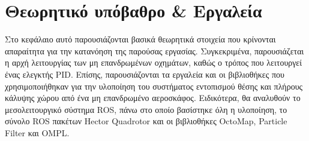 \chapter{Θεωρητικό υπόβαθρο \& Εργαλεία}
\label{chapter:theory_tools}

Στο κεφάλαιο αυτό παρουσιάζονται βασικά θεωρητικά στοιχεία που κρίνονται απαραίτητα για την κατανόηση της παρούσας εργασίας. Συγκεκριμένα, παρουσιάζεται η αρχή λειτουργίας των μη επανδρωμένων οχημάτων, καθώς ο τρόπος που λειτουργεί ένας ελεγκτής PID. Επίσης, παρουσιάζονται τα εργαλεία και οι βιβλιοθήκες που χρησιμοποιήθηκαν για την υλοποίηση του συστήματος εντοπισμού θέσης και πλήρους κάλυψης χώρου από ένα μη επανδρωμένο αεροσκάφος. Ειδικότερα, θα αναλυθούν το μεσολειτουργικό σύστημα ROS, πάνω στο οποίο βασίστηκε όλη η υλοποίηση, το σύνολο ROS πακέτων Hector Quadrotor και οι βιβλιοθήκες OctoMap, Particle Filter και OMPL.








